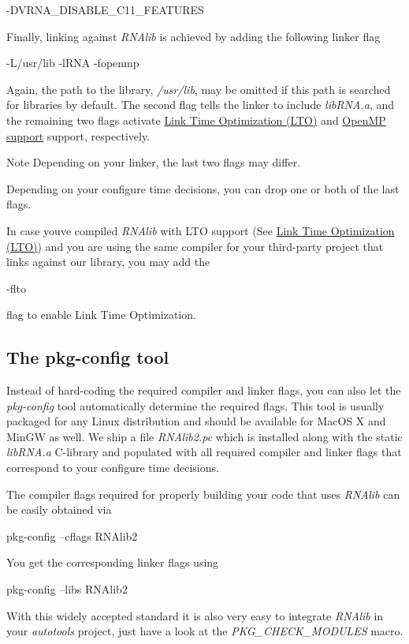 \begin{DoxyVerb}-DVRNA_DISABLE_C11_FEATURES
\end{DoxyVerb}


Finally, linking against {\itshape R\+N\+Alib} is achieved by adding the following linker flag

\begin{DoxyVerb}-L/usr/lib -lRNA -fopenmp
\end{DoxyVerb}


Again, the path to the library, {\itshape /usr/lib}, may be omitted if this path is searched for libraries by default. The second flag tells the linker to include {\itshape lib\+R\+N\+A.\+a}, and the remaining two flags activate \hyperlink{install_config_lto}{Link Time Optimization (L\+TO)} and \hyperlink{install_config_openmp}{Open\+MP support} support, respectively. \begin{DoxyNote}{Note}
Depending on your linker, the last two flags may differ. 

Depending on your configure time decisions, you can drop one or both of the last flags. 

In case you\textquotesingle{}ve compiled {\itshape R\+N\+Alib} with L\+TO support (See \hyperlink{install_config_lto}{Link Time Optimization (L\+TO)}) and you are using the same compiler for your third-\/party project that links against our library, you may add the
\begin{DoxyCode}
-flto 
\end{DoxyCode}
 flag to enable Link Time Optimization.
\end{DoxyNote}
\hypertarget{install_linking_pkgconfig}{}\subsection{The pkg-\/config tool}\label{install_linking_pkgconfig}
Instead of hard-\/coding the required compiler and linker flags, you can also let the {\itshape pkg-\/config} tool automatically determine the required flags. This tool is usually packaged for any Linux distribution and should be available for Mac\+OS X and Min\+GW as well. We ship a file {\itshape R\+N\+Alib2.\+pc} which is installed along with the static {\itshape lib\+R\+N\+A.\+a} C-\/library and populated with all required compiler and linker flags that correspond to your configure time decisions.

The compiler flags required for properly building your code that uses {\itshape R\+N\+Alib} can be easily obtained via

\begin{DoxyVerb}pkg-config --cflags RNAlib2
\end{DoxyVerb}


You get the corresponding linker flags using

\begin{DoxyVerb}pkg-config --libs RNAlib2
\end{DoxyVerb}


With this widely accepted standard it is also very easy to integrate {\itshape R\+N\+Alib} in your {\itshape autotools} project, just have a look at the {\itshape P\+K\+G\+\_\+\+C\+H\+E\+C\+K\+\_\+\+M\+O\+D\+U\+L\+ES} macro. 